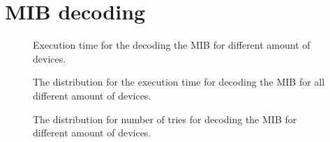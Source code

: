 \section{MIB decoding}

\begin{figure}[H]
\centering
\resizebox{0.5\textwidth}{!}{
}
\caption{Execution time for the decoding the MIB for different amount of devices.}
\label{fig:MT_MIB_Time}
\end{figure}

\begin{figure}[H]
\centering
\resizebox{0.5\textwidth}{!}{
}
\caption{The distribution for the execution time for decoding the MIB for all different amount of devices.}
\label{fig:MT_MIB_His}
\end{figure}


\begin{figure}[H]
\centering
\resizebox{0.5\textwidth}{!}{
}
\caption{The distribution for number of tries for decoding the MIB for different amount of devices.}
\label{fig:MT_MIB_Tries}
\end{figure}